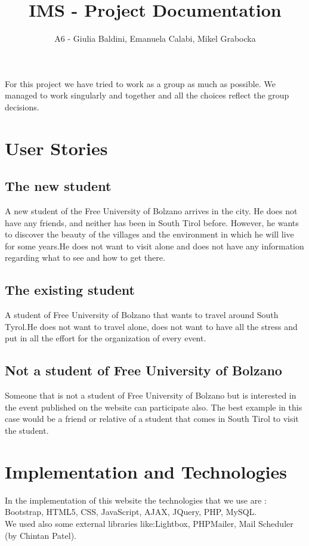 \documentclass[a4paper]{article}
\title{IMS - Project Documentation}
\author{A6 - Giulia Baldini, Emanuela Calabi, Mikel Grabocka}
\begin{document}
	\maketitle
	
	\noindent For this project we have tried to work as a group as much as possible. We managed to work singularly and together and all the choices reflect the group decisions.
	
	\section{User Stories}
	\subsection{The new student}
	A new student of the Free University of Bolzano arrives in the city. He does not have any friends, and neither has been in South Tirol before. However, he wants to discover the beauty of the villages and the environment in which he will live for some years.He does not want to visit alone and does not have any information regarding what to see and how to get there. \\
	\subsection{The existing student }
	A student of Free University of Bolzano that wants to travel around South Tyrol.He does not want to travel alone, does not want to have all the stress and put in all the effort for the organization of every event.\\ 
	\subsection{Not a student of Free University of Bolzano}
	Someone that is not a student of Free University of Bolzano but is interested in the event published on the website can participate also. The best example in this case would be a friend or relative of a student that comes in South Tirol to visit the student.\\
	
	\section{Implementation and Technologies}	
	In the implementation of this website the technologies that we use are : Bootstrap, HTML5, CSS, JavaScript, AJAX, JQuery, PHP, MySQL.\\
	We used also some external libraries like:Lightbox, PHPMailer, Mail Scheduler (by Chintan Patel). \\
\end{document}
